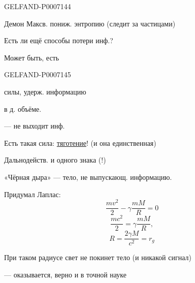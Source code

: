 \begin{GelfandAdjacentEvidence}{GELFAND-P000714}{4}


Демон Максв. пониж. энтропию (следит за частицами)

Есть ли ещё способы потери инф.?

Может быть, есть
\end{GelfandAdjacentEvidence}
\begin{GelfandAdjacentEvidence}{GELFAND-P000714}{5}

силы, удерж. информацию
\end{GelfandAdjacentEvidence}

в д. объёме.


--- не выходит инф.

Есть такая сила: \underline{тяготение}! (и она единственная)

Дальнодейств. и одного знака (!)

«Чёрная дыра» --- тело, не выпускающ. информацию.

Придумал Лаплас: 
\[
\frac{mv^2}{2}-\gamma\frac{mM}{R}=0
\]
\[
\frac{mc^2}{2}=\gamma\frac{mM}{R},
\]
\[
\boxed{R=\frac{2\gamma M}{c^2}=r_g}
\]

При таком радиусе свет не покинет тело (и никакой сигнал)

--- оказывается, верно и в точной науке


